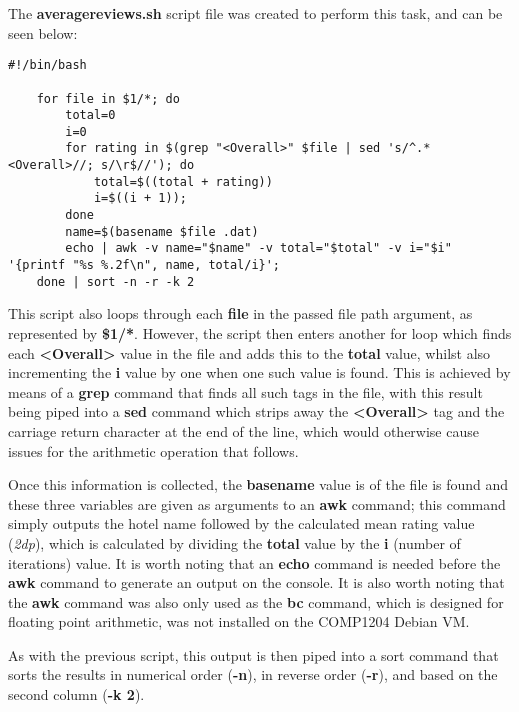 \documentclass{article}
\begin{document}
	\noindent
	The \textbf{averagereviews.sh} script file was created to perform this task, and can be seen below:
	
	\begin{lstlisting}[caption={averagereviews.sh}, captionpos=b]
	#!/bin/bash

	for file in $1/*; do
		total=0
		i=0
		for rating in $(grep "<Overall>" $file | sed 's/^.*<Overall>//; s/\r$//'); do
			total=$((total + rating))
			i=$((i + 1));
		done
		name=$(basename $file .dat)
		echo | awk -v name="$name" -v total="$total" -v i="$i" '{printf "%s %.2f\n", name, total/i}';
	done | sort -n -r -k 2
	\end{lstlisting}
	
	\noindent
	This script also loops through each \textbf{file} in the passed file path argument, as represented by \textbf{\$1/*}. However, the script then enters another for loop which finds each \textbf{{\textless}Overall\textgreater} value in the file and adds this to the \textbf{total} value, whilst also incrementing the \textbf{i} value by one when one such value is found. This is achieved by means of a \textbf{grep} command that finds all such tags in the file, with this result being piped into a \textbf{sed} command which strips away the \textbf{{\textless}Overall\textgreater} tag and the carriage return character at the end of the line, which would otherwise cause issues for the arithmetic operation that follows. \newline
	
	\noindent
	Once this information is collected, the \textbf{basename} value is of the file is found and these three variables are given as arguments to an \textbf{awk} command; this command simply outputs the hotel name followed by the calculated mean rating value (\textit{2dp}), which is calculated by dividing the \textbf{total} value by the \textbf{i} (number of iterations) value. It is worth noting that an \textbf{echo} command is needed before the \textbf{awk} command to generate an output on the console. It is also worth noting that the \textbf{awk} command was also only used as the \textbf{bc} command, which is designed for floating point arithmetic, was not installed on the COMP1204 Debian VM. \newline
	
	\noindent
	As with the previous script, this output is then piped into a sort command that sorts the results in numerical order (\textbf{-n}), in reverse order (\textbf{-r}), and based on the second column (\textbf{-k 2}).
	
\end{document}
